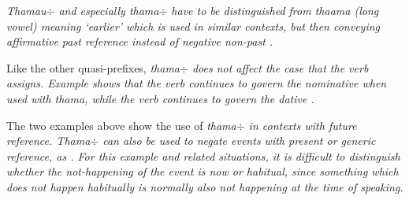 

\em Thamau$\div$ \em  and especially \em thama$\div$ \em have to be distinguished from \em thaama \em (long vowel) meaning `earlier' which is used in similar contexts, but then conveying affirmative past reference instead of negative non-past .

Like the other quasi-prefixes, \em thama$\div$ \em does not affect the case that the verb assigns. Example  shows that the verb  continues to govern the nominative when used with \em thama\em, while the verb  continues to govern the dative .


  

 
 

The two examples above  show the use of \em thama$\div$ \em in contexts with  future reference. \em Thama$\div$ \em can also be used to negate events with present or generic reference, as . For this example and related situations, it is difficult to distinguish whether the not-happening of the event is now or habitual, since something which does not happen habitually   is normally also not happening at the time of speaking.


